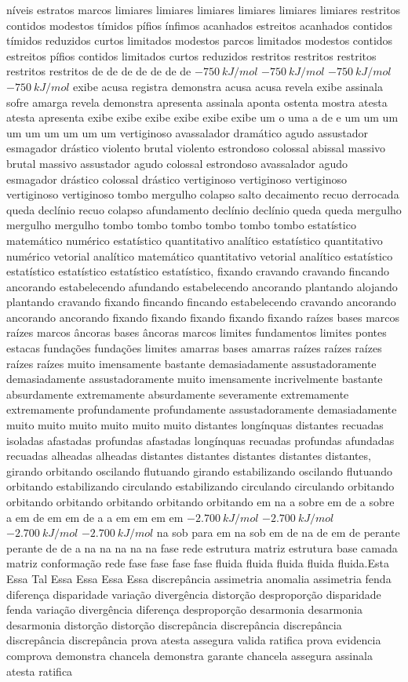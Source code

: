 níveis estratos marcos limiares limiares limiares limiares limiares limiares restritos contidos modestos tímidos pífios ínfimos acanhados estreitos acanhados contidos tímidos reduzidos curtos limitados modestos parcos limitados modestos contidos estreitos pífios contidos limitados curtos reduzidos restritos restritos restritos restritos restritos de de de de de de de $-750~kJ/mol$ $-750~kJ/mol$ $-750~kJ/mol$ $-750~kJ/mol$ exibe acusa registra demonstra acusa acusa revela exibe assinala sofre amarga revela demonstra apresenta assinala aponta ostenta mostra atesta atesta apresenta exibe exibe exibe exibe exibe exibe um o uma a de e um um um um um um um um um vertiginoso avassalador dramático agudo assustador esmagador drástico violento brutal violento estrondoso colossal abissal massivo brutal massivo assustador agudo colossal estrondoso avassalador agudo esmagador drástico colossal drástico vertiginoso vertiginoso vertiginoso vertiginoso vertiginoso tombo mergulho colapso salto decaimento recuo derrocada queda declínio recuo colapso afundamento declínio declínio queda queda mergulho mergulho mergulho tombo tombo tombo tombo tombo tombo estatístico matemático numérico estatístico quantitativo analítico estatístico quantitativo numérico vetorial analítico matemático quantitativo vetorial analítico estatístico estatístico estatístico estatístico estatístico, fixando cravando cravando fincando ancorando estabelecendo afundando estabelecendo ancorando plantando alojando plantando cravando fixando fincando fincando estabelecendo cravando ancorando ancorando ancorando fixando fixando fixando fixando fixando raízes bases marcos raízes marcos âncoras bases âncoras marcos limites fundamentos limites pontes estacas fundações fundações limites amarras bases amarras raízes raízes raízes raízes raízes muito imensamente bastante demasiadamente assustadoramente demasiadamente assustadoramente muito imensamente incrivelmente bastante absurdamente extremamente absurdamente severamente extremamente extremamente profundamente profundamente assustadoramente demasiadamente muito muito muito muito muito muito distantes longínquas distantes recuadas isoladas afastadas profundas afastadas longínquas recuadas profundas afundadas recuadas alheadas alheadas distantes distantes distantes distantes distantes, girando orbitando oscilando flutuando girando estabilizando oscilando flutuando orbitando estabilizando circulando estabilizando circulando circulando orbitando orbitando orbitando orbitando orbitando orbitando em na a sobre em de a sobre a em de em em de a a em em em em $-2.700~kJ/mol$ $-2.700~kJ/mol$ $-2.700~kJ/mol$ $-2.700~kJ/mol$ na sob para em na sob em de na de em de perante perante de de a na na na na na fase rede estrutura matriz estrutura base camada matriz conformação rede fase fase fase fase fluida fluida fluida fluida fluida.Esta Essa Tal Essa Essa Essa Essa discrepância assimetria anomalia assimetria fenda diferença disparidade variação divergência distorção desproporção disparidade fenda variação divergência diferença desproporção desarmonia desarmonia desarmonia distorção distorção discrepância discrepância discrepância discrepância discrepância prova atesta assegura valida ratifica prova evidencia comprova demonstra chancela demonstra garante chancela assegura assinala atesta ratifica 